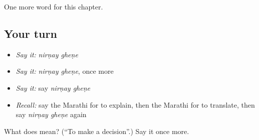 \begin{grammarlens}[title={What you've built}]
One more word for this chapter.
\end{grammarlens}

\subsection*{Your turn}
\begin{itemize}
\raggedright
  \item \emph{Say it:} \emph{nirṇay gheṇe}
  \item \emph{Say it:} \emph{nirṇay gheṇe}, once more
  \item \emph{Say it:} say \emph{nirṇay gheṇe}
  \item \emph{Recall:} say the Marathi for to explain, then the Marathi for to translate, then say \emph{nirṇay gheṇe} again
\end{itemize}

\begin{tcolorbox}[breakable,colback=teal!4,colframe=teal!35!black,title={Before you move on}]
What does   mean? (\textquotedblleft{}To make a decision\textquotedblright{}.) Say it once more.
\end{tcolorbox}

